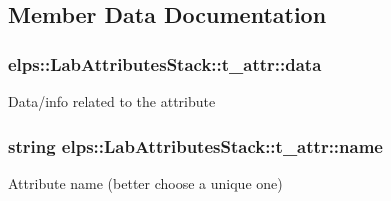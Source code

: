 \subsection{Member Data Documentation}
\hypertarget{structelps_1_1_lab_attributes_stack_1_1t__attr_a40f2a6b918faf72d03a62ce77e3a017c}{
\subsubsection[{data}]{ elps\+::\+Lab\+Attributes\+Stack\+::t\+\_\+attr\+::data}}\label{structelps_1_1_lab_attributes_stack_1_1t__attr_a40f2a6b918faf72d03a62ce77e3a017c}
Data/info related to the attribute \hypertarget{structelps_1_1_lab_attributes_stack_1_1t__attr_a6081ff65525e6e2895c72903da219803}{
\subsubsection[{name}]{\setlength{\rightskip}{0pt plus 5cm}string elps\+::\+Lab\+Attributes\+Stack\+::t\+\_\+attr\+::name}}\label{structelps_1_1_lab_attributes_stack_1_1t__attr_a6081ff65525e6e2895c72903da219803}
Attribute name (better choose a unique one) 